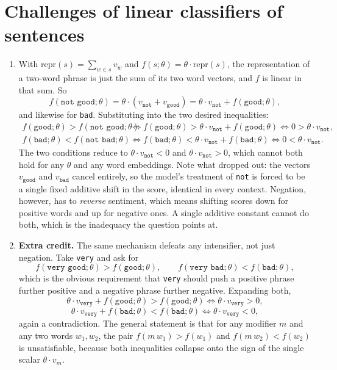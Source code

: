 \documentclass[11pt]{article}
\begin{document}
\section{Challenges of linear classifiers of sentences}

\begin{enumerate}
  \item With $\mathrm{repr}(s) = \sum_{w \in s} v_w$ and $f(s;\theta) = \theta \cdot \mathrm{repr}(s)$, the
        representation of a two-word phrase is just the sum of its two word vectors, and $f$ is linear in
        that sum. So
        \[
          f(\texttt{not good};\theta) = \theta\cdot(v_{\texttt{not}} + v_{\texttt{good}})
          = \theta\cdot v_{\texttt{not}} + f(\texttt{good};\theta),
        \]
        and likewise for \texttt{bad}. Substituting into the two desired inequalities:
        \begin{align*}
          f(\texttt{good};\theta) > f(\texttt{not good};\theta)
            &\iff f(\texttt{good};\theta) > \theta\cdot v_{\texttt{not}} + f(\texttt{good};\theta)
            \iff 0 > \theta\cdot v_{\texttt{not}}, \\
          f(\texttt{bad};\theta) < f(\texttt{not bad};\theta)
            &\iff f(\texttt{bad};\theta) < \theta\cdot v_{\texttt{not}} + f(\texttt{bad};\theta)
            \iff 0 < \theta\cdot v_{\texttt{not}} .
        \end{align*}
        The two conditions reduce to $\theta\cdot v_{\texttt{not}} < 0$ and
        $\theta\cdot v_{\texttt{not}} > 0$, which cannot both hold for any $\theta$ and any word
        embeddings. Note what dropped out: the vectors $v_{\texttt{good}}$ and $v_{\texttt{bad}}$ cancel
        entirely, so the model's treatment of \texttt{not} is forced to be a single fixed additive shift in
        the score, identical in every context. Negation, however, has to \emph{reverse} sentiment, which
        means shifting scores down for positive words and up for negative ones. A single additive constant
        cannot do both, which is the inadequacy the question points at.

  \item \textbf{Extra credit.} The same mechanism defeats any intensifier, not just negation. Take
        \texttt{very} and ask for
        \[
          f(\texttt{very good};\theta) > f(\texttt{good};\theta),
          \qquad
          f(\texttt{very bad};\theta) < f(\texttt{bad};\theta),
        \]
        which is the obvious requirement that \texttt{very} should push a positive phrase further positive
        and a negative phrase further negative. Expanding both,
        \[
          \theta\cdot v_{\texttt{very}} + f(\texttt{good};\theta) > f(\texttt{good};\theta)
          \iff \theta\cdot v_{\texttt{very}} > 0,
        \]
        \[
          \theta\cdot v_{\texttt{very}} + f(\texttt{bad};\theta) < f(\texttt{bad};\theta)
          \iff \theta\cdot v_{\texttt{very}} < 0,
        \]
        again a contradiction. The general statement is that for any modifier $m$ and any two words
        $w_1, w_2$, the pair $f(m\,w_1) > f(w_1)$ and $f(m\,w_2) < f(w_2)$ is unsatisfiable, because both
        inequalities collapse onto the sign of the single scalar $\theta\cdot v_m$.


\end{enumerate}
\end{document}
